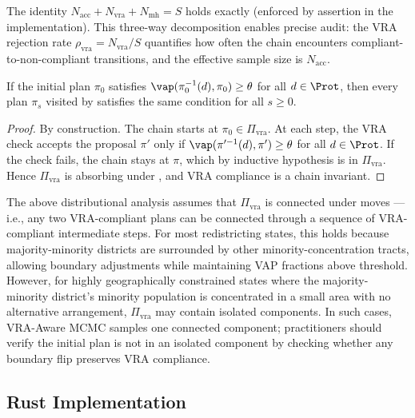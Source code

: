 The identity $N_{\mathrm{acc}} + N_{\mathrm{vra}} + N_{\mathrm{mh}} = S$
holds exactly (enforced by assertion in the implementation).
This three-way decomposition enables precise audit: the VRA rejection rate
$\rho_{\mathrm{vra}} = N_{\mathrm{vra}} / S$ quantifies how often the chain
encounters compliant-to-non-compliant transitions, and the effective sample
size is $N_{\mathrm{acc}}$.

\begin{proposition}
\label{prop:vra-invariant}
If the initial plan $\pi_0$ satisfies $\vap(\pi_0^{-1}(d), \pi_0) \geq \theta$
for all $d \in \Prot$, then every plan $\pi_s$ visited by \vr{} satisfies
the same condition for all $s \geq 0$.
\end{proposition}

\begin{proof}
By construction.
The chain starts at $\pi_0 \in \Pi_{\mathrm{vra}}$.
At each step, the VRA check accepts the proposal $\pi'$ only if
$\vap(\pi'^{-1}(d), \pi') \geq \theta$ for all $d \in \Prot$.
If the check fails, the chain stays at $\pi$, which by inductive hypothesis
is in $\Pi_{\mathrm{vra}}$.
Hence $\Pi_{\mathrm{vra}}$ is absorbing under \vr{}, and VRA compliance is
a chain invariant.
\end{proof}

\begin{remark}
The above distributional analysis assumes that $\Pi_{\mathrm{vra}}$ is connected under \fr{} moves --- i.e., any two VRA-compliant plans can be connected through a sequence of VRA-compliant intermediate steps. For most redistricting states, this holds because majority-minority districts are surrounded by other minority-concentration tracts, allowing boundary adjustments while maintaining VAP fractions above threshold. However, for highly geographically constrained states where the majority-minority district's minority population is concentrated in a small area with no alternative arrangement, $\Pi_{\mathrm{vra}}$ may contain isolated components. In such cases, VRA-Aware MCMC samples one connected component; practitioners should verify the initial plan is not in an isolated component by checking whether any boundary flip preserves VRA compliance.
\end{remark}

\subsection{Rust Implementation}

